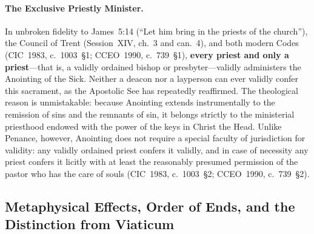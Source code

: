 \paragraph{The Exclusive Priestly Minister.}
In unbroken fidelity to James~5:14 (``Let him bring in the priests of the church''), the Council of Trent (Session~XIV, ch.~3 and can.~4), and both modern Codes (CIC~1983, c.~1003~\S1; CCEO~1990, c.~739~\S1), \textbf{every priest and only a priest}---that is, a validly ordained bishop or presbyter---validly administers the Anointing of the Sick. Neither a deacon nor a layperson can ever validly confer this sacrament, as the Apostolic See has repeatedly reaffirmed. The theological reason is unmistakable: because Anointing extends instrumentally to the remission of sins and the remnants of sin, it belongs strictly to the ministerial priesthood endowed with the power of the keys in Christ the Head. Unlike Penance, however, Anointing does not require a special faculty of jurisdiction for validity: any validly ordained priest confers it validly, and in case of necessity any priest confers it licitly with at least the reasonably presumed permission of the pastor who has the care of souls (CIC~1983, c.~1003~\S2; CCEO~1990, c.~739~\S2).

\subsection{Metaphysical Effects, Order of Ends, and the Distinction from Viaticum}
\label{subsec:anointing-effects-viaticum}

